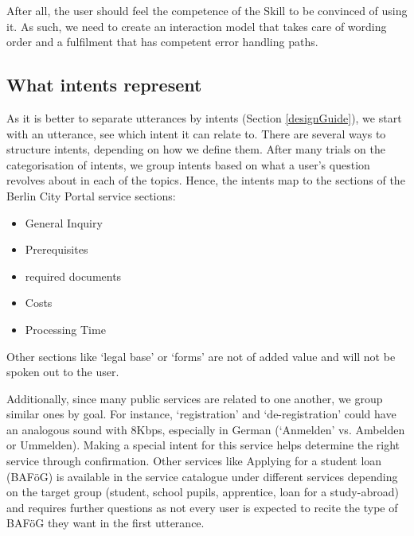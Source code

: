 




After all, the user should feel the competence of the Skill to be convinced of using it. %
As such, we need to create an interaction model that takes care of wording order and a fulfilment that has competent error handling paths. 

\subsection*{What intents represent}
 As it is better to separate utterances by intents (Section \ref{designGuide}), we start with an utterance, see which intent it can relate to. 
 There are several ways to structure intents, depending on how we define them. After many trials on the categorisation of intents, we group intents based on what a user's question revolves about in each of the topics. Hence, the intents map to the sections of the Berlin City Portal service sections:
 \begin{itemize}
 	\itemsep0em
\item General Inquiry
\item Prerequisites
\item required documents
\item Costs
\item Processing Time
 \end{itemize}
 
 Other sections like `legal base' or `forms' are not of added value and will not be spoken out to the user.
 
 Additionally, since many public services are related to one another, we group similar ones by goal. For instance, `registration' and `de-registration' could have an analogous sound with 8Kbps, especially in German (`Anmelden' vs. Ambelden or Ummelden). Making a special intent for this service helps determine the right service through confirmation. Other services like Applying for a student loan (BAFöG) is available in the service catalogue under different services depending on the target group (student, school pupils, apprentice, loan for a study-abroad) and requires further questions as not every user is expected to recite the type of BAFöG they want in the first utterance.



